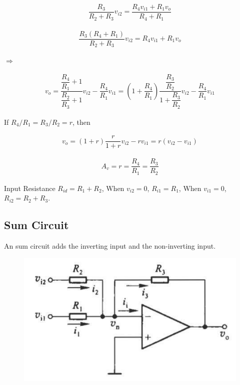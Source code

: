 \begin{equation*}
  \begin{aligned}
    \dfrac{R_3}{R_2 + R_3} v_{i2} = \dfrac{R_4 v_{i1} + R_1 v_o}{R_4 + R_1}
  \end{aligned}
\end{equation*}

\begin{equation*}
  \begin{aligned}
    \dfrac{R_3 \left( R_4 + R_1 \right)}{R_2 + R_3} v_{i2} = R_4 v_{i1} + R_1 v_o
  \end{aligned}
\end{equation*}

$\Rightarrow$

\begin{equation*}
  \begin{aligned}
    v_o = \dfrac{\dfrac{R_4}{R_1} + 1 }{\dfrac{R_2}{R_3} + 1 } v_{i2} - \dfrac{R_4}{R_1} v_{i1}  = \left( 1 + \dfrac{R_4}{R_1}  \right) \dfrac{\dfrac{R_3}{R_2} }{1 + \dfrac{R_3}{R_2} } v_{i2} - \dfrac{R_4}{R_1} v_{i1} 
  \end{aligned}
\end{equation*}

If $R_4 / R_1 = R_3 / R_2 = r$, then

\begin{equation*}
  \begin{aligned}
    v_o = \left( 1 + r \right) \dfrac{r}{1 + r} v_{i2} - r v_{i1} = r \left( v_{i2} - v_{i1} \right) 
  \end{aligned}
\end{equation*}

\begin{equation*}
  \begin{aligned}
    A_v = r = \dfrac{R_4}{R_1} = \dfrac{R_3}{R_2}  
  \end{aligned}
\end{equation*}

Input Resistance $R_{id} = R_1 + R_2$, When $v_{i2} = 0$, $R_{i1} = R_1$, When $v_{i1}  = 0$, $R_{i2} = R_2 + R_3$.

\subsection{Sum Circuit}

An sum circuit adds the inverting input and the non-inverting input.

\begin{figure}[H]
  \centering
  \includegraphics[width=0.75\linewidth]{figures/sum-amplifier}
\end{figure}

